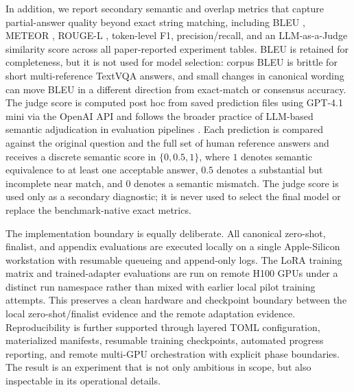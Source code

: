 In addition, we report secondary semantic and overlap metrics that capture partial-answer quality beyond exact string matching, including BLEU \citep{papineni2002bleu}, METEOR \citep{banerjee2005meteor}, ROUGE-L \citep{lin2004rouge}, token-level F1, precision/recall, and an LLM-as-a-Judge similarity score across all paper-reported experiment tables. BLEU is retained for completeness, but it is not used for model selection: corpus BLEU is brittle for short multi-reference TextVQA answers, and small changes in canonical wording can move BLEU in a different direction from exact-match or consensus accuracy. The judge score is computed post hoc from saved prediction files using GPT-4.1 mini via the OpenAI API \citep{openai2025gpt41} and follows the broader practice of LLM-based semantic adjudication in evaluation pipelines \citep{zheng2023judging}. Each prediction is compared against the original question and the full set of human reference answers and receives a discrete semantic score in $\{0, 0.5, 1\}$, where $1$ denotes semantic equivalence to at least one acceptable answer, $0.5$ denotes a substantial but incomplete near match, and $0$ denotes a semantic mismatch. The judge score is used only as a secondary diagnostic; it is never used to select the final model or replace the benchmark-native exact metrics.

The implementation boundary is equally deliberate. All canonical zero-shot, finalist, and appendix evaluations are executed locally on a single Apple-Silicon workstation with resumable queueing and append-only logs. The LoRA training matrix and trained-adapter evaluations are run on remote H100 GPUs under a distinct run namespace rather than mixed with earlier local pilot training attempts. This preserves a clean hardware and checkpoint boundary between the local zero-shot/finalist evidence and the remote adaptation evidence. Reproducibility is further supported through layered TOML configuration, materialized manifests, resumable training checkpoints, automated progress reporting, and remote multi-GPU orchestration with explicit phase boundaries. The result is an experiment that is not only ambitious in scope, but also inspectable in its operational details.
